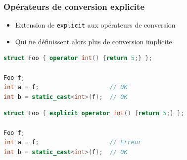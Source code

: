 \documentclass[C++.tex]{subfiles}
\begin{document}
\begin{frame}[fragile]
	\frametitle{Opérateurs de conversion explicite}
	\begin{itemize}
		\item Extension de \lstinline|explicit| aux opérateurs de conversion
		\item Qui ne définissent alors plus de conversion implicite
	\end{itemize}

	\begin{lstlisting}[language=C++]
struct Foo { operator int() {return 5;} };

Foo f;
int a = f;	                  // OK
int b = static_cast<int>(f);  // OK\end{lstlisting}

	\begin{lstlisting}[language=C++]
struct Foo { explicit operator int() {return 5;} };

Foo f;
int a = f;	                  // Erreur
int b = static_cast<int>(f);  // OK\end{lstlisting}
\end{frame}
\end{document}
